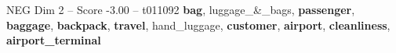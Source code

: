 \begin{textsample}{NEG Dim 2 – Score -3.00 – t011092}  \label{ex:f2_neg_027}
\textbf{bag}, luggage\_\&\_bags, \textbf{passenger}, \textbf{baggage}, \textbf{backpack}, \textbf{travel}, hand\_luggage, \textbf{customer}, \textbf{airport}, \textbf{cleanliness}, \textbf{airport\_terminal}

\end{textsample}
